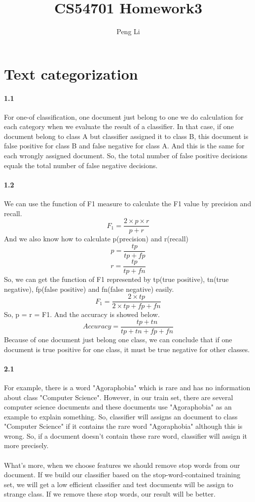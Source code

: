 \documentclass{article}
\author{Peng Li}
\title{CS54701 Homework3}
\begin{document}
		\maketitle
		\section{Text categorization}
		\paragraph{1.1} 
		For one-of classification, one document just belong to one we do calculation for each category when we evaluate the result of a classifier. In that case, if one document belong to class A but classifier assigned it to class B, this document is false positive for class B and false negative for class A. And this is the same for each wrongly assigned document. So, the total number of false positive decisions equals the total number of false negative decisions.
		\paragraph{1.2}
		We can use the function of F1 measure to calculate the F1 value by precision and recall.
		$$ F_1 = \frac{2 \times p \times r}{p+r} $$
		And we also know how to calculate p(precision) and r(recall)
		$$ p = \frac{tp}{tp+fp} $$
		$$ r = \frac{tp}{tp+fn} $$
		So, we can get the function of F1 represented by tp(true positive), tn(true negative), fp(false positive) and fn(false negative) easily. 
		$$ F_1 = \frac{2 \times tp}{2 \times tp + fp + fn} $$
		So, p = r = F1.
		And the accuracy is showed below.
		$$ Accuracy = \frac{tp + tn}{tp + tn + fp + fn} $$
		Because of one document just belong one class, we can conclude that if one document is true positive for one class, it must be true negative for other classes. 
		\paragraph{2.1}
		For example, there is a word "Agoraphobia" which is rare and has no information about class "Computer Science". However, in our train set, there are several computer science documents and these documents use "Agoraphobia" as an example to explain something. So, classifier will assigns an document to class "Computer Science" if it contains the rare word "Agoraphobia" although this is wrong. So, if a document doesn't contain these rare word, classifier will assign it more precisely.\\ \\
		What's more, when we choose features we should remove stop words from our document. If we build our classifier based on the stop-word-contained training set, we will get a low efficient classifier and test documents will be assign to strange class. If we remove these stop words, our result will be better.
\end{document}

